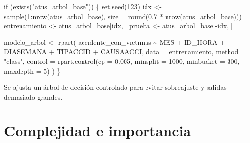 \documentclass[
  spanish,
  10.5pt,
  letterpaper,
  openany,
  headings=big]{scrbook}
\newenvironment{Shaded}{}{}
\newcommand{\AttributeTok}[1]{\textcolor[rgb]{0.84,0.23,0.29}{#1}}
\newcommand{\ControlFlowTok}[1]{\textcolor[rgb]{0.84,0.23,0.29}{#1}}
\newcommand{\DecValTok}[1]{\textcolor[rgb]{0.00,0.36,0.77}{#1}}
\newcommand{\FloatTok}[1]{\textcolor[rgb]{0.00,0.36,0.77}{#1}}
\newcommand{\FunctionTok}[1]{\textcolor[rgb]{0.44,0.26,0.76}{#1}}
\newcommand{\NormalTok}[1]{\textcolor[rgb]{0.14,0.16,0.18}{#1}}
\newcommand{\OtherTok}[1]{\textcolor[rgb]{0.44,0.26,0.76}{#1}}
\newcommand{\SpecialCharTok}[1]{\textcolor[rgb]{0.00,0.36,0.77}{#1}}
\newcommand{\StringTok}[1]{\textcolor[rgb]{0.01,0.18,0.38}{#1}}
\begin{document}
\begin{Shaded}
\begin{Highlighting}[]
\ControlFlowTok{if}\NormalTok{ (}\FunctionTok{exists}\NormalTok{(}\StringTok{"atus\_arbol\_base"}\NormalTok{)) \{}
  \FunctionTok{set.seed}\NormalTok{(}\DecValTok{123}\NormalTok{)}
\NormalTok{  idx }\OtherTok{\textless{}{-}} \FunctionTok{sample}\NormalTok{(}\DecValTok{1}\SpecialCharTok{:}\FunctionTok{nrow}\NormalTok{(atus\_arbol\_base), }\AttributeTok{size =} \FunctionTok{round}\NormalTok{(}\FloatTok{0.7} \SpecialCharTok{*} \FunctionTok{nrow}\NormalTok{(atus\_arbol\_base)))}
\NormalTok{  entrenamiento }\OtherTok{\textless{}{-}}\NormalTok{ atus\_arbol\_base[idx, ]}
\NormalTok{  prueba }\OtherTok{\textless{}{-}}\NormalTok{ atus\_arbol\_base[}\SpecialCharTok{{-}}\NormalTok{idx, ]}

\NormalTok{  modelo\_arbol }\OtherTok{\textless{}{-}} \FunctionTok{rpart}\NormalTok{(}
\NormalTok{    accidente\_con\_victimas }\SpecialCharTok{\textasciitilde{}}\NormalTok{ MES }\SpecialCharTok{+}\NormalTok{ ID\_HORA }\SpecialCharTok{+}\NormalTok{ DIASEMANA }\SpecialCharTok{+}\NormalTok{ TIPACCID }\SpecialCharTok{+}\NormalTok{ CAUSAACCI,}
    \AttributeTok{data =}\NormalTok{ entrenamiento,}
    \AttributeTok{method =} \StringTok{"class"}\NormalTok{,}
    \AttributeTok{control =} \FunctionTok{rpart.control}\NormalTok{(}\AttributeTok{cp =} \FloatTok{0.005}\NormalTok{, }\AttributeTok{minsplit =} \DecValTok{1000}\NormalTok{, }\AttributeTok{minbucket =} \DecValTok{300}\NormalTok{, }\AttributeTok{maxdepth =} \DecValTok{5}\NormalTok{)}
\NormalTok{  )}
\NormalTok{\}}
\end{Highlighting}
\end{Shaded}

\begin{tcolorbox}[enhanced jigsaw, arc=.35mm, bottomrule=.15mm, bottomtitle=1mm, breakable, colback=white, colbacktitle=quarto-callout-note-color!10!white, colframe=quarto-callout-note-color-frame, coltitle=black, left=2mm, leftrule=.75mm, opacityback=0, opacitybacktitle=0.6, rightrule=.15mm, title=\textcolor{quarto-callout-note-color}{\faInfo}\hspace{0.5em}{Explicación del código}, titlerule=0mm, toprule=.15mm, toptitle=1mm]

Se ajusta un árbol de decisión controlado para evitar sobreajuste y
salidas demasiado grandes.

\end{tcolorbox}

\section{Complejidad e importancia}\label{complejidad-e-importancia}
\end{document}

